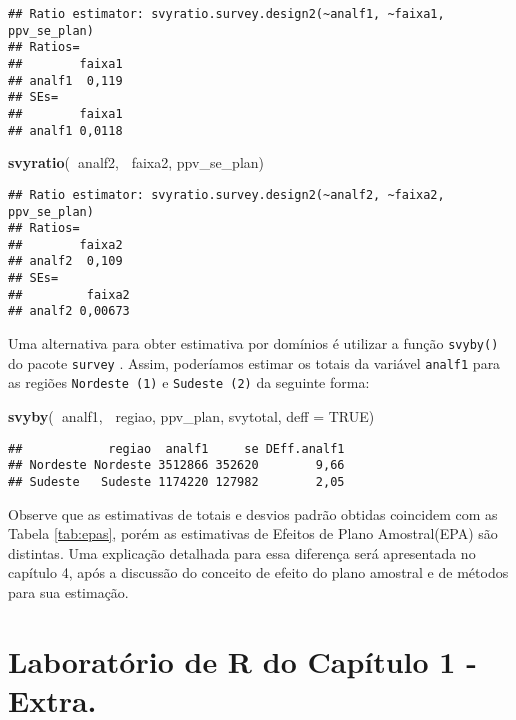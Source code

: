 \documentclass[]{book}
\newenvironment{Shaded}{\begin{snugshade}}{\end{snugshade}}
\newcommand{\KeywordTok}[1]{\textcolor[rgb]{0.13,0.29,0.53}{\textbf{#1}}}
\newcommand{\DataTypeTok}[1]{\textcolor[rgb]{0.13,0.29,0.53}{#1}}
\newcommand{\OtherTok}[1]{\textcolor[rgb]{0.56,0.35,0.01}{#1}}
\newcommand{\OperatorTok}[1]{\textcolor[rgb]{0.81,0.36,0.00}{\textbf{#1}}}
\newcommand{\NormalTok}[1]{#1}
\theoremstyle{definition}
\theoremstyle{definition}
\theoremstyle{definition}
\theoremstyle{remark}
\begin{document}
\begin{verbatim}
## Ratio estimator: svyratio.survey.design2(~analf1, ~faixa1, ppv_se_plan)
## Ratios=
##        faixa1
## analf1  0,119
## SEs=
##        faixa1
## analf1 0,0118
\end{verbatim}

\begin{Shaded}
\begin{Highlighting}[]
\KeywordTok{svyratio}\NormalTok{(}\OperatorTok{~}\NormalTok{analf2, }\OperatorTok{~}\NormalTok{faixa2, ppv_se_plan)}
\end{Highlighting}
\end{Shaded}

\begin{verbatim}
## Ratio estimator: svyratio.survey.design2(~analf2, ~faixa2, ppv_se_plan)
## Ratios=
##        faixa2
## analf2  0,109
## SEs=
##         faixa2
## analf2 0,00673
\end{verbatim}

Uma alternativa para obter estimativa por domínios é utilizar a função
\texttt{svyby()} do pacote \texttt{survey} \citep{R-survey}. Assim,
poderíamos estimar os totais da variável \texttt{analf1} para as regiões
\texttt{Nordeste\ (1)} e \texttt{Sudeste\ (2)} da seguinte forma:

\begin{Shaded}
\begin{Highlighting}[]
\KeywordTok{svyby}\NormalTok{(}\OperatorTok{~}\NormalTok{analf1, }\OperatorTok{~}\NormalTok{regiao, ppv_plan, svytotal, }\DataTypeTok{deff =} \OtherTok{TRUE}\NormalTok{)}
\end{Highlighting}
\end{Shaded}

\begin{verbatim}
##            regiao  analf1     se DEff.analf1
## Nordeste Nordeste 3512866 352620        9,66
## Sudeste   Sudeste 1174220 127982        2,05
\end{verbatim}

Observe que as estimativas de totais e desvios padrão obtidas coincidem
com as Tabela \ref{tab:epas}, porém as estimativas de Efeitos de Plano
Amostral(EPA) são distintas. Uma explicação detalhada para essa
diferença será apresentada no capítulo 4, após a discussão do conceito
de efeito do plano amostral e de métodos para sua estimação.

\section{Laboratório de R do Capítulo 1 -
Extra.}\label{laboratorio-de-r-do-capitulo-1---extra.}
\end{document}
